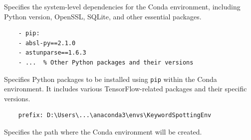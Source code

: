 Specifies the system-level dependencies for the Conda environment, including Python version, OpenSSL, SQLite, and other essential packages.

\begin{verbatim}
	- pip:
	- absl-py==2.1.0
	- astunparse==1.6.3
	- ...  % Other Python packages and their versions
\end{verbatim}

Specifies Python packages to be installed using \texttt{pip} within the Conda environment. It includes various TensorFlow-related packages and their specific versions.

\begin{verbatim}
	prefix: D:\Users\...\anaconda3\envs\KeywordSpottingEnv
\end{verbatim}

Specifies the path where the Conda environment will be created. 


